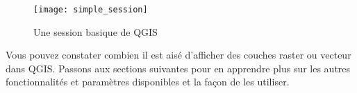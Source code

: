 

\begin{figure}[ht]    \begin{center}    \caption{Une session basique de QGIS \nixcaption}\label{fig:simple_session}\smallskip    \texttt{[image: simple\_session]} \end{center}   \end{figure}

Vous pouvez constater combien il est aisé d'afficher des couches raster ou vecteur dans QGIS. Passons aux sections suivantes pour en apprendre plus sur les autres fonctionnalités et paramètres disponibles et la façon de les utiliser.
